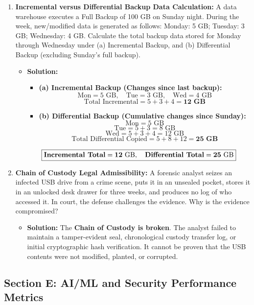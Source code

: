 \begin{enumerate}[label=\textbf{Problem \arabic*.,resume},leftmargin=1.5cm]
\item \textbf{Incremental versus Differential Backup Data Calculation:}
A data warehouse executes a Full Backup of 100 GB on Sunday night. During the week, new/modified data is generated as follows: Monday: 5 GB; Tuesday: 3 GB; Wednesday: 4 GB. Calculate the total backup data stored for Monday through Wednesday under (a) Incremental Backup, and (b) Differential Backup (excluding Sunday's full backup).
\begin{itemize}
\item \textbf{Solution:}
\begin{itemize}
\item \textbf{(a) Incremental Backup (Changes since last backup):}
\[ \text{Mon} = 5\text{ GB}, \quad \text{Tue} = 3\text{ GB}, \quad \text{Wed} = 4\text{ GB} \]
\[ \text{Total Incremental} = 5 + 3 + 4 = \mathbf{12\text{ GB}} \]
\item \textbf{(b) Differential Backup (Cumulative changes since Sunday):}
\[ \text{Mon} = 5\text{ GB} \]
\[ \text{Tue} = 5 + 3 = 8\text{ GB} \]
\[ \text{Wed} = 5 + 3 + 4 = 12\text{ GB} \]
\[ \text{Total Differential Copied} = 5 + 8 + 12 = \mathbf{25\text{ GB}} \]
\end{itemize}
\[ \boxed{\text{\textbf{Incremental Total}} = \mathbf{12\text{ GB}}, \quad \text{\textbf{Differential Total}} = \mathbf{25\text{ GB}}} \]
\end{itemize}

\item \textbf{Chain of Custody Legal Admissibility:}
A forensic analyst seizes an infected USB drive from a crime scene, puts it in an unsealed pocket, stores it in an unlocked desk drawer for three weeks, and produces no log of who accessed it. In court, the defense challenges the evidence. Why is the evidence compromised?
\begin{itemize}
\item \textbf{Solution:} The \textbf{Chain of Custody is broken}. The analyst failed to maintain a tamper-evident seal, chronological custody transfer log, or initial cryptographic hash verification. It cannot be proven that the USB contents were not modified, planted, or corrupted.
\end{itemize}
\end{enumerate}

\subsection{Section E: AI/ML and Security Performance Metrics}

